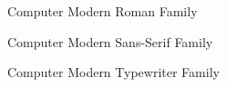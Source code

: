 \documentclass[a4paper,12pt]{article}
\begin{document}
	\rmfamily Computer Modern Roman Family

	\sffamily Computer Modern Sans-Serif Family
	
	\ttfamily Computer Modern Typewriter Family
	
\end{document}
